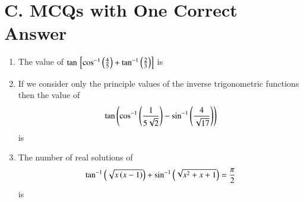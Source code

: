 \documentclass[journal,12pt,onecolumn,article]{IEEEtran}
\theoremstyle{remark}
\begin{document}
\section*{C. MCQs with One Correct Answer}
\begin{enumerate}
\item The value of $\tan {}\left[ \cos ^{-1}\left(\frac{4}{5}\right)+\tan^{-1}\left(\frac{2}{3}\right) \right]$ is
\hfill {}
\begin{enumerate}
\end{enumerate}
\item If we consider only the principle values of the inverse trigonometric functions then the value of
\begin{align*}
\tan \left(\cos ^{-1}\left(\frac{1}{5\sqrt{2}}\right)-\sin ^{-1}\left(\frac{4}{\sqrt{17}}\right)\right)
\end{align*}
is
\hfill {}
\begin{enumerate}
\end{enumerate}
\item The number of real solutions of
\begin{align*}
\tan ^{-1}\left(\sqrt{x\left(x-1\right)}\right)+\sin ^{-1}\left(\sqrt{x^2+x+1}\right)=\frac{\pi}{2}
\end{align*}
is 
\hfill {}
\begin{enumerate}

\end{enumerate}
\end{enumerate}
\end{document}
